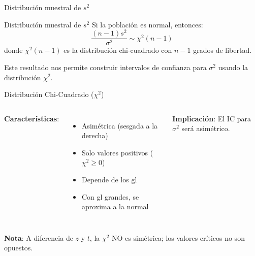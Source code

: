\documentclass[aspectratio=169, 11pt]{beamer}
\begin{document}
\begin{frame}{Distribuci\'on muestral de $s^2$}
\begin{block}{Distribuci\'on muestral de $s^2$}
Si la poblaci\'on es normal, entonces:
\[
\frac{(n-1)s^2}{\sigma^2} \sim \chi^2(n-1)
\]
donde $\chi^2(n-1)$ es la distribuci\'on chi-cuadrado con $n-1$ grados de libertad.
\end{block}

\vspace{0.5em}
Este resultado nos permite construir intervalos de confianza para $\sigma^2$ usando la distribuci\'on $\chi^2$.
\end{frame}

\begin{frame}{Distribución Chi-Cuadrado ($\chi^2$)}
\begin{columns}[T]
\textbf{Características}:
\begin{itemize}
  \item \alert{Asimétrica} (sesgada a la derecha)
  \item Solo valores positivos ($\chi^2 \geq 0$)
  \item Depende de los gl
  \item Con gl grandes, se aproxima a la normal
\end{itemize}

\vspace{0.3cm}
\textbf{Implicación}: El IC para $\sigma^2$ será \alert{asimétrico}.

\end{columns}

\vspace{0.3cm}
\small
\textbf{Nota}: A diferencia de $z$ y $t$, la $\chi^2$ NO es simétrica; los valores críticos no son opuestos.
\end{frame}
\end{document}
